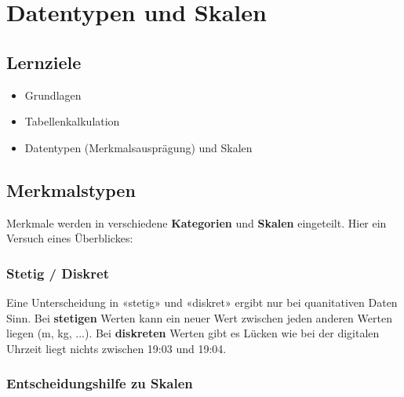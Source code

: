 
\section{Datentypen und Skalen}

\subsection*{Lernziele}

\begin{itemize}
  \item Grundlagen
  \item Tabellenkalkulation
  \item Datentypen (Merkmalsausprägung) und Skalen
\end{itemize}


\newpage



\subsection{Merkmalstypen}
Merkmale werden in verschiedene \textbf{Kategorien} und \textbf{Skalen} eingeteilt. Hier ein Versuch eines Überblickes:



\subsubsection{Stetig / Diskret}
Eine Unterscheidung in «stetig» und
«diskret» ergibt nur bei quanitativen Daten Sinn. Bei
\textbf{stetigen} Werten kann ein neuer Wert zwischen jeden anderen
Werten liegen (m, kg, ...). Bei \textbf{diskreten} Werten gibt es
Lücken wie \zB bei der digitalen Uhrzeit liegt nichts zwischen 19:03
und 19:04.
\newpage

\subsubsection{Entscheidungshilfe zu Skalen}

